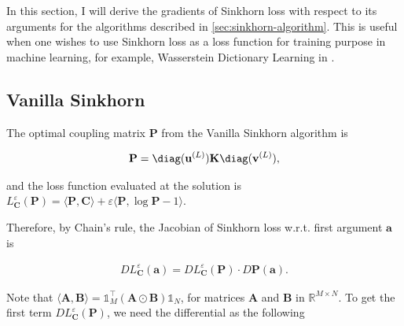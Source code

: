 
In this section, I will derive the gradients of Sinkhorn loss with respect to its arguments for the algorithms
described in \cref{sec:sinkhorn-algorithm}.
This is useful when one wishes to use Sinkhorn loss as a loss function for training purpose in machine learning,
for example,
Wasserstein Dictionary Learning in .


\subsection{Vanilla Sinkhorn}\label{subsec:gradient-vanilla-sinkhorn}

The optimal coupling matrix $\mathbf{P}$ from the Vanilla Sinkhorn algorithm is

\begin{equation}\label{eqn:optimal-coupling-solution-from-sinkhorn}
  \begin{aligned}
    \mathbf{P} = \diag(\mathbf{u}^{(L)}) \mathbf{K} \diag(\mathbf{v}^{(L)}),
  \end{aligned}
\end{equation}

and the loss function evaluated at the solution is
$L_{\mathbf{C}}^\varepsilon(\mathbf{P}) =
  \langle \mathbf{P}, \mathbf{C}\rangle + \varepsilon\langle\mathbf{P}, \log \mathbf{P} - 1\rangle $.

Therefore, by Chain's rule, the Jacobian of Sinkhorn loss w.r.t. first argument $\mathbf{a}$ is

\begin{equation}\label{eqn:jacobian-loss-wrt-chainrule}
  \begin{aligned}
    D L_{\mathbf{C}}^\varepsilon(\mathbf{a})
    = D L_{\mathbf{C}}^\varepsilon(\mathbf{P}) \cdot D \mathbf{P}(\mathbf{a}).
  \end{aligned}
\end{equation}

Note that $\langle \mathbf{A}, \mathbf{B}\rangle = \mathbb{1}_M^\top \left(\mathbf{A}\odot \mathbf{B}\right) \mathbb{1}_N$,
for matrices $\mathbf{A}$ and $\mathbf{B}$ in $\mathbb{R}^{M\times N}$.
To get the first term $D L_{\mathbf{C}}^\varepsilon(\mathbf{P})$, we need the differential as the following

